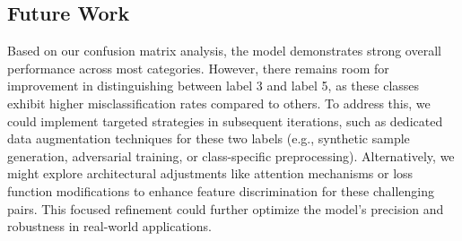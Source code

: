 \documentclass[a4paper,11pt]{article}
\begin{document}
\subsection{Future Work}
Based on our confusion matrix analysis, the model demonstrates strong overall performance across most categories. However, there remains room for improvement in distinguishing between label 3 and label 5, as these classes exhibit higher misclassification rates compared to others. To address this, we could implement targeted strategies in subsequent iterations, such as dedicated data augmentation techniques for these two labels (e.g., synthetic sample generation, adversarial training, or class-specific preprocessing). Alternatively, we might explore architectural adjustments like attention mechanisms or loss function modifications to enhance feature discrimination for these challenging pairs. This focused refinement could further optimize the model's precision and robustness in real-world applications.
\end{document}
